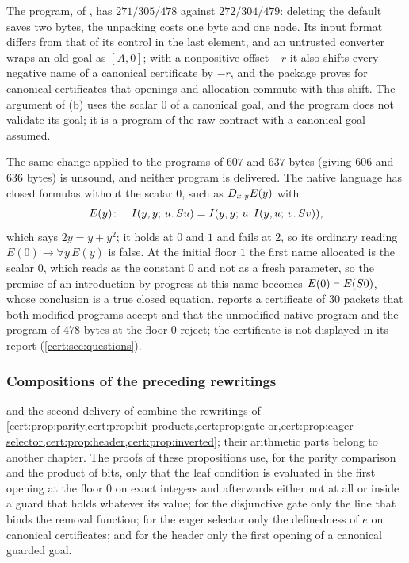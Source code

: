 The program, of , has $271/305/478$ against
$272/304/479$: deleting the default saves two bytes, the unpacking costs one
byte and one node. Its input format differs from that of its control in the
last element, and an untrusted converter wraps an old goal as $[A,0]$; with a
nonpositive offset $-r$ it also shifts every negative name of a canonical
certificate by $-r$, and the package proves for canonical certificates that
openings and allocation commute with this shift. The argument of (b) uses the
scalar $0$ of a canonical goal, and the program does not validate its goal; it
is a program of the raw contract with a canonical goal assumed.

\begin{remark}\label{cert:rem:header-native}
The same change applied to the programs of $607$ and $637$ bytes (giving $606$
and $636$ bytes) is unsound, and neither program is delivered. The native
language has closed formulas without the scalar $0$, such as
$D_{x,y}E(y)$ with
\[
E(y)\colon\quad I(y,y;\,u.\,S u)=I(y,y;\,u.\,I(y,u;\,v.\,S v)),
\]
which says $2y=y+y^{2}$; it holds at $0$ and $1$ and fails at $2$, so its
ordinary reading $E(0)\to\forall y\,E(y)$ is false. At the initial floor $1$
the first name allocated is the scalar $0$, which reads as the constant $0$ and
not as a fresh parameter, so the premise of an introduction by progress at
this name becomes $E(0)\vdash E(S 0)$, whose conclusion is a true closed
equation.  reports a certificate
of $30$ packets that both modified programs accept and that the unmodified
native program and the program of $478$ bytes at the floor $0$ reject; the
certificate is not displayed in its report (\cref{cert:sec:questions}).
\end{remark}

\subsubsection*{Compositions of the preceding rewritings}

 and the second delivery of  combine
the rewritings of \cref{cert:prop:parity,cert:prop:bit-products,cert:prop:gate-or,cert:prop:eager-selector,cert:prop:header,cert:prop:inverted};
their arithmetic parts belong to another chapter. The proofs of these
propositions use, for the parity comparison and the product of bits, only that
the leaf condition is evaluated in the first opening at the floor $0$ on exact
integers and afterwards either not at all or inside a guard that holds
whatever its value; for the disjunctive gate only the line that binds the
removal function; for the eager selector only the definedness of $e$ on
canonical certificates; and for the header only the first opening of a
canonical guarded goal.

